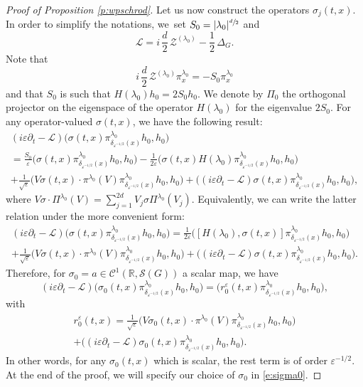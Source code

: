 \documentclass[10pt]{amsart}
\let\mathcal\mathscr
\theoremstyle{plain}
\theoremstyle{definition}
\let\eps\varepsilon
\def\R{{\mathbb R}}
\begin{document}
\begin{proof}[Proof of Proposition \ref{p:wpschrod}]
Let us now construct the operators $\sigma_j(t,x)$.
In order to simplify the notations, we~set $S_0=
|\lambda_0|^{\sfrac{d}{ 2}}$ and
\[
\mathcal L = i \,\frac{d}{2}\, \mathcal Z ^{(\lambda_0)} -\frac 12\, \Delta_G.
\]
Note that
\[
i\,\frac{d}{2}\, \mathcal Z ^{(\lambda_0)}\pi^{\lambda_0}_x= -S_0 \pi^{\lambda_0}_x
\]
and that $S_0$ is such that $H(\lambda_0) h_0= 2S_0 h_0$. We denote by $\Pi_0$ the orthogonal projector on the eigenspace of the operator $H(\lambda_0)$ for the eigenvalue $2S_0$.
For any operator-valued $\sigma(t,x)$, we have the following result:
\begin{multline*}
(i\eps\partial_t-\mathcal{L})\bigl(\sigma(t,x)\pi^{\lambda_0}_{\delta_{\eps^{-1/2}}(x)}h_0,h_0\bigr)\\
=\frac{S_0}{\eps}\bigl(\sigma (t,x)\pi^{\lambda_0}_{\delta_{\eps^{-1/2}}(x)}h_0,h_0\bigr)-\frac{1}{2\eps}\bigl(\sigma (t,x)H(\lambda_0)\pi^{\lambda_0}_{\delta_{\eps^{-1/2}}(x)}h_0,h_0\bigr)\\
+\frac{1}{\sqrt\eps}\bigl(V\sigma(t,x)\cdot \pi^{\lambda_0}(V)\pi^{\lambda_0}_{\delta_{\eps^{-1/2}}(x)}h_0,h_0\bigr)+\bigl((i\eps\partial_t-\mathcal{L})\sigma (t,x)\pi^{\lambda_0}_{\delta_{\eps^{-1/2}}(x)}h_0,h_0\bigr),
\end{multline*}
where $V\sigma\cdot \Pi^{\lambda_0}(V)= \sum_{j=1}^{2d} V_j\sigma \Pi^{\lambda_0}(V_j)$.
Equivalently, we can write the latter relation under the more convenient form:
\begin{multline}
\label{computationcle}
(i\eps\partial_t-\mathcal{L})\bigl(\sigma (t,x)\pi^{\lambda_0}_{\delta_{\eps^{-1/2}}(x)}h_0,h_0\bigr)=\frac{1}{2\eps}\bigl([H(\lambda_0),\sigma (t,x)]\pi^{\lambda_0}_{\delta_{\eps^{-1/2}}(x)}h_0,h_0\bigr)\\
+\frac{1}{\sqrt\eps}\bigl(V\sigma(t,x)\cdot \pi^{\lambda_0}(V)\pi^{\lambda_0}_{\delta_{\eps^{-1/2}}(x)}h_0,h_0\bigr)+\bigl((i\eps\partial_t-\mathcal{L})\sigma(t,x)\pi^{\lambda_0}_{\delta_{\eps^{-1/2}}(x)}h_0,h_0\bigr).
\end{multline}
Therefore, for $\sigma_0=a\in\mathcal{C}^1(\R,\mathcal{S}(G))$ a scalar map, we have
\begin{equation*}
(i\eps \partial_t - \mathcal{L})\bigl(\sigma_0(t,x)\pi^{\lambda_0}_{\delta_{\eps^{-1/2}}(x)}h_0,h_0\bigr)=
\bigl(r_0^\eps(t,x)\pi^{\lambda_0}_{\delta_{\eps^{-1/2}}(x)}h_0,h_0\bigr),
\end{equation*}
with
\begin{multline*}%
r_0^\eps(t,x)= \frac{1}{\sqrt\eps} \bigl(V\sigma_0(t,x)\cdot \pi^{\lambda_0}(V)\pi^{\lambda_0}_{\delta_{\eps^{-1/2}}(x)}h_0,h_0\bigr)\\
+\bigl((i\eps\partial_t -\mathcal{L})\sigma_0(t,x)\pi^{\lambda_0}_{\delta_{\eps^{-1/2}}(x)}h_0,h_0\bigr).
\end{multline*}
In other words, for any $\sigma_0(t,x)$ which is scalar, the rest term is of order $\eps^{-1/2}$. At the end of the proof, we will specify our choice of $\sigma_0$ in \eqref{e:sigma0}.


\end{proof}
\end{document}
